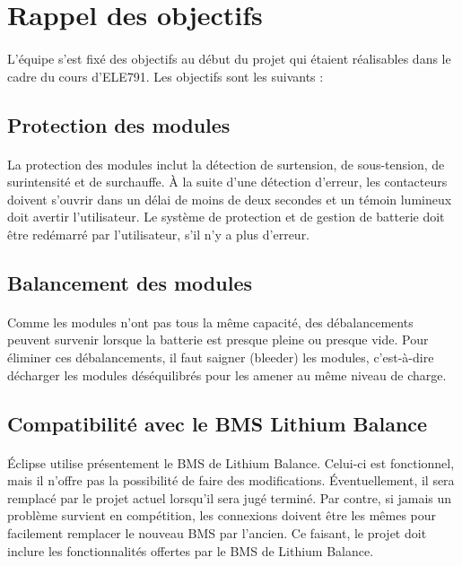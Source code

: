 \section{Rappel des objectifs}

	\paragraph{}
	L’équipe s’est fixé des objectifs au début du projet qui étaient réalisables dans le cadre du cours d’ELE791. Les objectifs sont les suivants :

	\subsection{Protection des modules}
	
		\paragraph{}
		La protection des modules inclut la détection de surtension, de sous-tension, de surintensité et de surchauffe. À la suite d’une détection d’erreur, les contacteurs doivent s’ouvrir dans un délai de moins de deux secondes et un témoin lumineux doit avertir l’utilisateur. Le système de protection et de gestion de batterie doit être redémarré par l’utilisateur, s’il n’y a plus d’erreur.

	\subsection{Balancement des modules}

		\paragraph{}
		Comme les modules n’ont pas tous la même capacité, des débalancements peuvent survenir lorsque la batterie est presque pleine ou presque vide. Pour éliminer ces débalancements, il faut saigner (bleeder) les modules, c’est-à-dire décharger les modules déséquilibrés pour les amener au même niveau de charge.
		
	\subsection{Compatibilité avec le BMS Lithium Balance}

		\paragraph{}
		Éclipse utilise présentement le BMS de Lithium Balance. Celui-ci est fonctionnel, mais il n’offre pas la possibilité de faire des modifications. Éventuellement, il sera remplacé par le projet actuel lorsqu'il sera jugé terminé. Par contre, si jamais un problème survient en compétition, les connexions doivent être les mêmes pour facilement remplacer le nouveau BMS par l’ancien. Ce faisant, le projet doit inclure les fonctionnalités offertes par le BMS de Lithium Balance.

